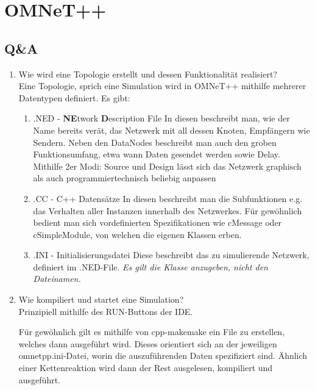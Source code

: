 \documentclass[11pt]{article}
\begin{document}
    \graphicspath{{PictureDoc/}}


    \section{OMNeT++}
    \subsection{Q\&A}

    \begin{enumerate}[\thesubsection .1]
        \item Wie wird eine Topologie erstellt und dessen Funktionalität realisiert?\\
        Eine Topologie, sprich eine Simulation wird in OMNeT++ mithilfe mehrerer Datentypen definiert. Es gibt:
        \begin{enumerate}[$\circ$]
            \item .NED - \textbf{NE}twork \textbf{D}escription File
            In diesen beschreibt man, wie der Name bereits verät, das Netzwerk mit all dessen Knoten, Empfängern wie Sendern.
            Neben den DataNodes beschreibt man auch den groben Funktionsumfang, etwa wann Daten gesendet werden sowie Delay.
            Mithilfe 2er Modi: Source und Design lässt sich das Netzwerk graphisch als auch programmiertechnisch beliebig anpassen
            \item .CC - C++ Datensätze
            In diesen beschreibt man die Subfunktionen e.g. das Verhalten aller Instanzen innerhalb des Netzwerkes.
            Für gewöhnlich bedient man sich vordefinierten Spezifikationen wie cMessage oder cSimpleModule, von welchen
            die eigenen Klassen erben.
            \item .INI - Initialisierungsdatei
            Diese beschreibt das zu simulierende Netzwerk, definiert im .NED-File.
            \emph{Es gilt die Klasse anzugeben, nicht den Dateinamen.}
        \end{enumerate}

        \item Wie kompiliert und startet eine Simulation?\\
        Prinzipiell mithilfe des RUN-Buttons der IDE.

        Für gewöhnlich gilt es mithilfe von cpp-makemake ein File zu erstellen, welches dann ausgeführt wird.
        Dieses orientiert sich an der jeweiligen omnetpp.ini-Datei, worin die auszuführenden Daten spezifiziert sind.
        Ähnlich einer Kettenreaktion wird dann der Rest ausgelesen, kompiliert und ausgeführt.


\end{enumerate}
\end{document}
